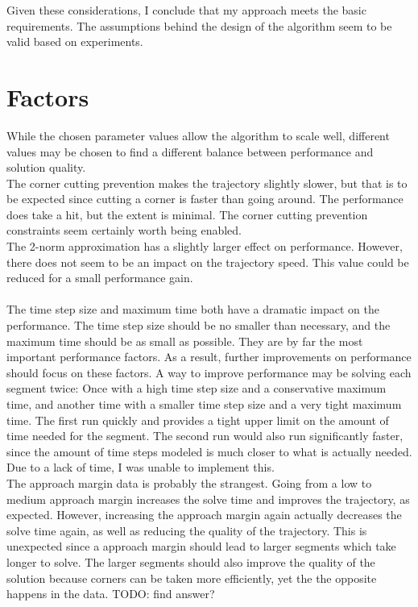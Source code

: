 Given these considerations, I conclude that my approach meets the basic requirements. The assumptions behind the design of the algorithm seem to be valid based on experiments.

\section{Factors}
While the chosen parameter values allow the algorithm to scale well, different values may be chosen to find a different balance between performance and solution quality. \\
The corner cutting prevention makes the trajectory slightly slower, but that is to be expected since cutting a corner is faster than going around. The performance does take a hit, but the extent is minimal. The corner cutting prevention constraints seem certainly worth being enabled. \\
The 2-norm approximation has a slightly larger effect on performance. However, there does not seem to be an impact on the trajectory speed. This value could be reduced for a small performance gain. \\ \\

The time step size and maximum time both have a dramatic impact on the performance. The time step size should be no smaller than necessary, and the maximum time should be as small as possible. They are by far the most important performance factors. As a result, further improvements on performance should focus on these factors. A way to improve performance may be solving each segment twice: Once with a high time step size and a conservative maximum time, and another time with a smaller time step size and a very tight maximum time. The first run quickly and provides a tight upper limit on the amount of time needed for the segment. The second run would also run significantly faster, since the amount of time steps modeled is much closer to what is actually needed. Due to a lack of time, I was unable to implement this. \\

The approach margin data is probably the strangest. Going from a low to medium approach margin increases the solve time and improves the trajectory, as expected. However, increasing the approach margin again actually decreases the solve time again, as well as reducing the quality of the trajectory. This is unexpected since a approach margin should lead to larger segments which take longer to solve. The larger segments should also improve the quality of the solution because corners can be taken more efficiently, yet the the opposite happens in the data. TODO: find answer?







